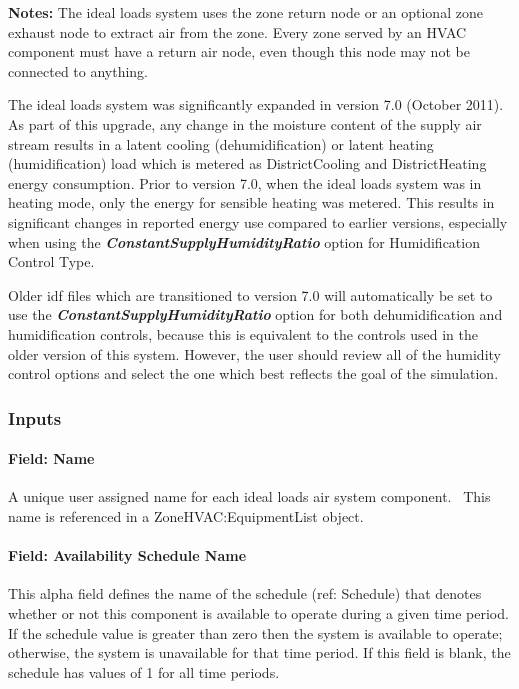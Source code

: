 \textbf{Notes:} The ideal loads system uses the zone return node or an optional zone exhaust node to extract air from the zone. Every zone served by an HVAC component must have a return air node, even though this node may not be connected to anything.

The ideal loads system was significantly expanded in version 7.0 (October 2011). As part of this upgrade, any change in the moisture content of the supply air stream results in a latent cooling (dehumidification) or latent heating (humidification) load which is metered as DistrictCooling and DistrictHeating energy consumption. Prior to version 7.0, when the ideal loads system was in heating mode, only the energy for sensible heating was metered. This results in significant changes in reported energy use compared to earlier versions, especially when using the \textbf{\emph{ConstantSupplyHumidityRatio}} option for Humidification Control Type.

Older idf files which are transitioned to version 7.0 will automatically be set to use the \textbf{\emph{ConstantSupplyHumidityRatio}} option for both dehumidification and humidification controls, because this is equivalent to the controls used in the older version of this system. However, the user should review all of the humidity control options and select the one which best reflects the goal of the simulation.

\subsubsection{Inputs}\label{inputs-056}

\paragraph{Field: Name}\label{field-name-054}

A unique user assigned name for each ideal loads air system component.~ This name is referenced in a ZoneHVAC:EquipmentList object.

\paragraph{Field: Availability Schedule Name}\label{field-availability-schedule-name-020}

This alpha field defines the name of the schedule (ref: Schedule) that denotes whether or not this component is available to operate during a given time period. If the schedule value is greater than zero then the system is available to operate; otherwise, the system is unavailable for that time period. If this field is blank, the schedule has values of 1 for all time periods.

